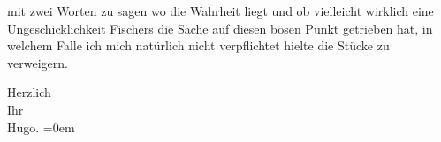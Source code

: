                mit zwei Worten zu sagen wo die Wahrheit liegt und ob vielleicht wirklich eine
               Ungeschicklichkeit Fischers die Sache auf
               diesen bösen Punkt getrieben hat, in welchem Falle ich mich natürlich nicht
               verpflichtet hielte die Stücke zu verweigern.\pend
           
\pstart
           Herzlich{\\[\baselineskip]}Ihr{\\[\baselineskip]}\spacefill\mbox{Hugo.}\pend
           \leftskip=0em{}\endnumbering{}  \newcommand{\dateiname}{L01454}\newcommand{\titel}{Hugo von Hofmannsthal an Arthur Schnitzler, 14. 10. 1904}\newcommand{\editorInnen}{Martin Anton Müller und Gerd-Hermann Susen}
